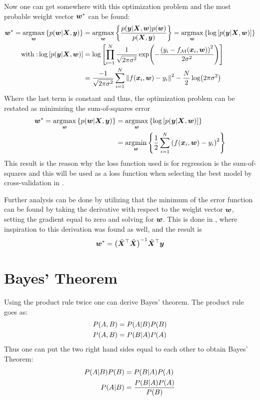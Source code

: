 Now one can get somewhere with this optimization problem and the most probable weight vector $\boldsymbol{w}^*$ can be found: 
\begin{equation*}
    \begin{split}
    \boldsymbol{w}^* = \operatorname*{\arg\!\max}_{\boldsymbol{w}} \left\{ {p(\boldsymbol{w}|\bm{X},\bm{y})} \right\} &=  \operatorname*{\arg\!\max}_{\boldsymbol{w}} \left\{ { \dfrac{p\qty(\bm{y}|\bm{X},\boldsymbol{w}) p\qty(\boldsymbol{w})}{p\qty(\bm{X},\bm{y})} } \right\} = \operatorname*{\arg\!\max}_{\boldsymbol{w}} \left\{ {\log \qty[p\qty(\bm{y}|\bm{X},\boldsymbol{w})]} \right\} \\
    \mathrm{with:} \log \qty[p\qty(\bm{y}|\bm{X},\boldsymbol{w})] &=  \log \qty[\prod_{i=1}^{N} \dfrac{1}{\sqrt{2 \pi \sigma^2}} \exp(-\dfrac{\qty(y_i-f_{\mathcal{M}}\qty(\bm{x}_i,\boldsymbol{w}))^2}{2 \sigma^2})]  \\
    &= \dfrac{-1}{\sqrt{2\pi\sigma^2}} \sum_{i=1}^{N} \norm{f\qty(\bm{x}_i,\boldsymbol{w})-y_i}^2 - \dfrac{N}{2} \log(2\pi\sigma^2)
    \end{split}
\end{equation*}
Where the last term is constant and thus, the optimization problem can be restated as minimizing the sum-of-squares error
\begin{equation}
    \begin{split}
        \boldsymbol{w}^* = \operatorname*{\arg\!\max}_{\boldsymbol{w}} \left\{ {p\qty(\boldsymbol{w}|\bm{X},\bm{y})} \right\}&= \operatorname*{\arg\!\max}_{\boldsymbol{w}} \left\{ {\log \qty[ p\qty(\bm{y}|\bm{X},\boldsymbol{w})]} \right\}\\
        &=\operatorname*{\arg\!\min}_{\boldsymbol{w}} \left\{ { \dfrac{1}{2} \sum_{i=1}^{N} \qty(f\qty(\bm{x}_i,\boldsymbol{w}) - y_i)^2 } \right\} 
    \end{split}
\end{equation}
This result is the reason why the loss function used is for regression is the sum-of-squares and this will be used as a loss function when selecting the best model by cross-validation in .

Further analysis can be done by utilizing that the minimum of the error function can be found by taking the derivative with respect to the weight vector $ \boldsymbol{w}$, setting the gradient equal to zero and solving for $\boldsymbol{w}$. This is done in \citep{allhailkingMorten}, where inspiration to this derivation was found as well, and the result is
\begin{equation}
    \boldsymbol{w}^* = \qty( \tilde{\bm{X}}^{\top} \tilde{\bm{X}} )^{-1} \tilde{\bm{X}}^{\top} \bm{y}
\end{equation}
\section{Bayes' Theorem}
Using the product rule twice one can derive Bayes' theorem. The product rule goes as: \\
\begin{align}
        P\qty(A,B) &= P\qty(A|B) P\qty(B) \\
        P\qty(A,B) &= P\qty(B|A) P\qty(A)
\end{align}
Thus one can put the two right hand sides equal to each other to obtain Bayes' Theorem:
\begin{align}
      P\qty(A|B) P(B) &=  P\qty(B|A) P(A) \\
      P\qty(A|B)      &= \dfrac{P\qty(B|A) P(A)}{P(B)}
\end{align}
